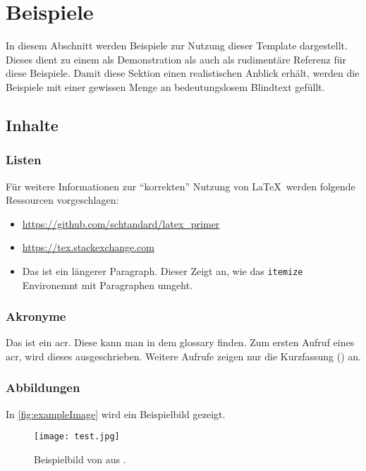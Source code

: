 \chapter{Beispiele}

In diesem Abschnitt werden Beispiele zur Nutzung dieser Template dargestellt.
Dieses dient zu einem als Demonstration als auch als rudimentäre Referenz für diese Beispiele.
Damit diese Sektion einen realistischen Anblick erhält, werden die Beispiele mit einer gewissen Menge an bedeutungslosem Blindtext gefüllt.

\section{Inhalte}

\subsection{Listen}

Für weitere Informationen zur \enquote{korrekten} Nutzung von \LaTeX\ werden folgende Ressourcen vorgeschlagen:

\begin{itemize}
    \item \url{https://github.com/schtandard/latex_primer}
    \item \url{https://tex.stackexchange.com}
    \item Das ist ein längerer Paragraph.
    Dieser Zeigt an, wie das \texttt{itemize} Environemnt mit Paragraphen umgeht.
\end{itemize}

\lipsum[1]

\subsection{Akronyme}

Das ist ein \gls{acr}.
Diese kann man in dem \gls{glossary} finden.
Zum ersten Aufruf eines \gls{acr}, wird dieses ausgeschrieben.
Weitere Aufrufe zeigen nur die Kurzfassung () an.
\lipsum[2]

\subsection{Abbildungen}

In \autoref{fig:exampleImage} wird ein Beispielbild gezeigt.
\lipsum[3]

\begin{figure}[ht]
    \centering
    \texttt{[image: test.jpg]}
    \caption[Beispielbild]{Beispielbild von \citeauthor{exampleImage} aus \autocite{exampleImage}.}
    \label{fig:exampleImage}
\end{figure}

